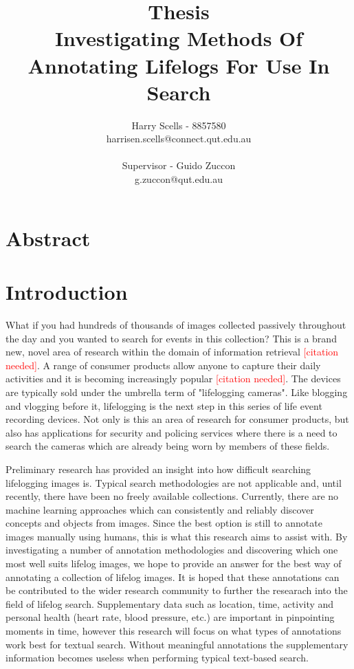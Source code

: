 \documentclass[12pt,a4paper]{article}
\newcommand\todo[1]{\textcolor{red}{#1}}
\begin{document}
\title{\small Thesis\\\huge Investigating Methods Of Annotating Lifelogs For Use In Search}

\author{Harry Scells - 8857580\\harrisen.scells@connect.qut.edu.au\\\\\small Supervisor - Guido Zuccon\\\small g.zuccon@qut.edu.au\\}
\maketitle
\pagebreak
\tableofcontents
\pagebreak

\section{Abstract}

\section{Introduction}

What if you had hundreds of thousands of images collected passively throughout the day and you wanted to search for events in this collection? This is a brand new, novel area of research within the domain of information retrieval \todo{[citation needed]}. A range of consumer products allow anyone to capture their daily activities and it is becoming increasingly popular \todo{[citation needed]}. The devices are typically sold under the umbrella term of "lifelogging cameras". Like blogging and vlogging before it, lifelogging is the next step in this series of life event recording devices. Not only is this an area of research for consumer products, but also has applications for security and policing services where there is a need to search the cameras which are already being worn by members of these fields.

Preliminary research has provided an insight into how difficult searching lifelogging images is. Typical search methodologies are not applicable and, until recently, there have been no freely available collections. Currently, there are no machine learning approaches which can consistently and reliably discover concepts and objects from images. Since the best option is still to annotate images manually using humans, this is what this research aims to assist with. By investigating a number of annotation methodologies and discovering which one most well suits lifelog images, we hope to provide an answer for the best way of annotating a collection of lifelog images. It is hoped that these annotations can be contributed to the wider research community to further the researach into the field of lifelog search. Supplementary data such as location, time, activity and personal health (heart rate, blood pressure, etc.) are important in pinpointing moments in time, however this research will focus on what types of annotations work best for textual search. Without meaningful annotations the supplementary information becomes useless when performing typical text-based search.
\end{document}
